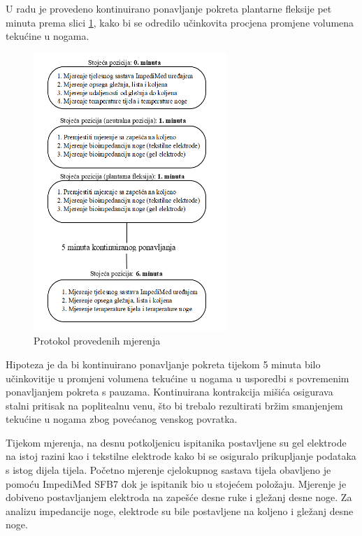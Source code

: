 \documentclass[../diplomski_rad.tex]{subfiles}
\begin{document}
U radu je provedeno kontinuirano ponavljanje pokreta plantarne fleksije pet minuta prema slici \ref{slk:protokol}, 
kako bi se odredilo učinkovita procjena promjene volumena tekućine u nogama. 

\begin{figure}[htb]
    \centering
    \includegraphics[width=0.65\textwidth]{Figures/protokol.png} 
    \caption{Protokol provedenih mjerenja}
    \label{slk:protokol}
\end{figure}

Hipoteza je da bi kontinuirano ponavljanje pokreta tijekom 5 minuta bilo učinkovitije u promjeni volumena 
tekućine u nogama u usporedbi s povremenim ponavljanjem pokreta s pauzama. 
Kontinuirana kontrakcija mišića osigurava stalni pritisak na poplitealnu venu, 
što bi trebalo rezultirati bržim smanjenjem tekućine u nogama zbog povećanog venskog povratka.

Tijekom mjerenja, na desnu potkoljenicu ispitanika postavljene su gel elektrode na istoj razini kao i 
tekstilne elektrode kako bi se osiguralo prikupljanje podataka s istog dijela tijela. 
Početno mjerenje cjelokupnog sastava tijela obavljeno je pomoću ImpediMed SFB7 dok je ispitanik bio u stojećem položaju. 
Mjerenje je dobiveno postavljanjem elektroda na zapešće desne ruke i gležanj desne noge. 
Za analizu impedancije noge, elektrode su bile postavljene na koljeno i gležanj desne noge.
\end{document}
